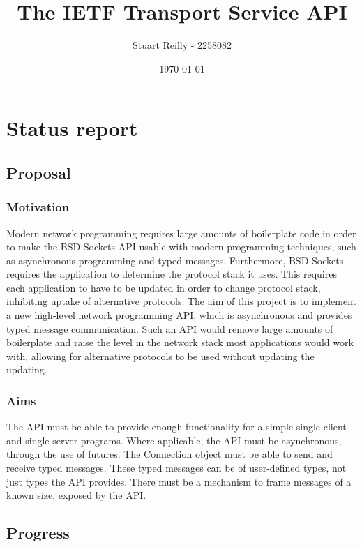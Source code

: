 \documentclass[11pt]{article}
\title{The IETF Transport Service API}
\author{Stuart Reilly - 2258082}
\date{\today}
\begin{document}
\maketitle

\section{Status report}

\subsection{Proposal}\label{proposal}

\subsubsection{Motivation}\label{motivation}

Modern network programming requires large amounts of boilerplate code in order
to make the BSD Sockets API usable with modern programming techniques, such
as asynchronous programming and typed messages.
Furthermore, BSD Sockets requires the application to determine the protocol
stack it uses.
This requires each application to have to be updated in order to change
protocol stack, inhibiting uptake of alternative protocols.
The aim of this project is to implement a new high-level network programming
API, which is asynchronous and provides typed message communication.
Such an API would remove large amounts of boilerplate and raise the level in 
the network stack most applications would work with, allowing for alternative
protocols to be used without updating the updating.

\subsubsection{Aims}\label{aims}

The API must be able to provide enough functionality for a simple single-client
and single-server programs.
Where applicable, the API must be asynchronous, through the use of futures.
The Connection object must be able to send and receive typed messages.
These typed messages can be of user-defined types, not just types the API
provides.
There must be a mechanism to frame messages of a known size, exposed by the
API.

\subsection{Progress}\label{progress}
\end{document}
